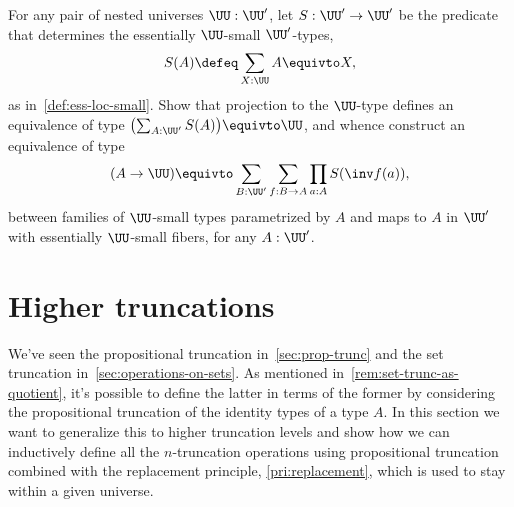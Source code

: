 \begin{xca}
  For any pair of nested universes $\UU:\UU'$,
  let $S : \UU' \to \UU'$ be the predicate that determines the
  essentially $\UU$-small $\UU'$-types,
  \[
    S(A) \defeq \sum_{X:\UU}A\equivto X,
  \]
  as in~\cref{def:ess-loc-small}.
  Show that projection to the $\UU$-type defines an
  equivalence of type $\bigl(\sum_{A:\UU'}S(A)\bigr) \equivto \UU$,
  and whence construct an equivalence of type
  \[
    (A \to \UU) \equivto
    \sum_{B:\UU'}\sum_{f:B\to A}\prod_{a:A}S(\inv f(a)),
  \]
  between families of $\UU$-small types parametrized by $A$
  and maps to $A$ in $\UU'$ with essentially $\UU$-small fibers,
  for any $A:\UU'$.
\end{xca}

\section{Higher truncations}
\label{sec:higher-truncations}

We've seen the propositional truncation in~\cref{sec:prop-trunc} and
the set truncation in~\cref{sec:operations-on-sets}.
As mentioned in~\cref{rem:set-trunc-as-quotient},
it's possible to define the latter in terms of the former by considering
the propositional truncation of the identity types of a type $A$.
In this section we want to generalize this to higher truncation levels
and show how we can inductively define all the $n$-truncation operations
using propositional truncation
combined with the replacement principle, \cref{pri:replacement},
which is used to stay within a given universe.

